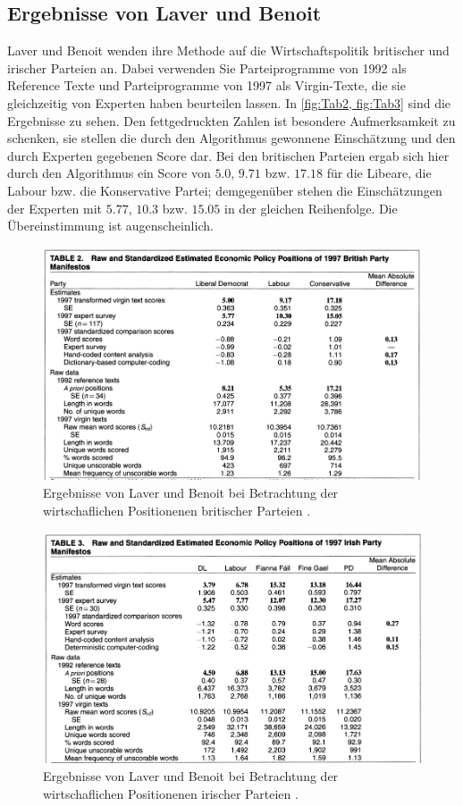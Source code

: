   
\subsection{Ergebnisse von Laver und Benoit}
Laver und Benoit \cite{LuB} wenden ihre Methode auf die Wirtschaftspolitik britischer und irischer Parteien an. Dabei verwenden Sie Parteiprogramme von 1992 als Reference Texte und Parteiprogramme von 1997 als Virgin-Texte, die sie gleichzeitig von Experten haben beurteilen lassen. In \ref{fig:Tab2, fig:Tab3} sind die Ergebnisse zu sehen. Den fettgedruckten Zahlen ist besondere Aufmerksamkeit zu schenken, sie stellen die durch den Algorithmus gewonnene Einschätzung und den durch Experten gegebenen Score dar. Bei den britischen Parteien ergab sich hier durch den Algorithmus ein Score von $5.0$, $9.71$ bzw. $17.18$ für die Libeare, die Labour bzw. die Konservative Partei; demgegenüber stehen die Einschätzungen der Experten mit $5.77$, $10.3$ bzw. $15.05$ in der gleichen Reihenfolge. Die Übereinstimmung ist augenscheinlich.

\begin{figure}
   \includegraphics[width=\textwidth]{images/Tab2_LuB.png}
   \caption{Ergebnisse von Laver und Benoit bei Betrachtung der wirtschaflichen Positionenen britischer Parteien \cite{LuB}.\label{fig:Tab2}}
\end{figure}
\begin{figure}
   \includegraphics[width=\textwidth]{images/Tab3_LuB.png}
   \caption{Ergebnisse von Laver und Benoit bei Betrachtung der wirtschaflichen Positionenen irischer Parteien \cite{LuB}. \label{fig:Tab3}}
\end{figure}

